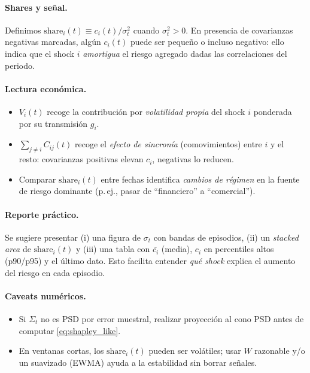 \documentclass[11pt,a4paper]{article}
\newcommand{\1}{\mathbf{1}}
\begin{document}
\paragraph{Shares y señal.}
Definimos \(\text{share}_i(t) \equiv c_i(t)/\sigma_t^2\) cuando \(\sigma_t^2>0\). En presencia de covarianzas negativas marcadas, algún \(c_i(t)\) puede ser pequeño o incluso negativo: ello indica que el shock \(i\) \emph{amortigua} el riesgo agregado dadas las correlaciones del periodo.

\paragraph{Lectura económica.}
\begin{itemize}
  \item \(V_i(t)\) recoge la contribución por \emph{volatilidad propia} del shock \(i\) ponderada por su transmisión \(g_i\).
  \item \(\sum_{j\ne i} C_{ij}(t)\) recoge el \emph{efecto de sincronía} (comovimientos) entre \(i\) y el resto: covarianzas positivas elevan \(c_i\), negativas lo reducen.
  \item Comparar \(\text{share}_i(t)\) entre fechas identifica \emph{cambios de régimen} en la fuente de riesgo dominante (p.\,ej., pasar de ``financiero'' a ``comercial'').
\end{itemize}

\paragraph{Reporte práctico.}
Se sugiere presentar (i) una figura de \(\sigma_t\) con bandas de episodios, (ii) un \emph{stacked area} de \(\text{share}_i(t)\) y (iii) una tabla con \(\overline{c_i}\) (media), \(c_i\) en percentiles altos (p90/p95) y el último dato. Esto facilita entender \emph{qué shock} explica el aumento del riesgo en cada episodio.

\paragraph{Caveats numéricos.}
\begin{itemize}
  \item Si \(\Sigma_t\) no es PSD por error muestral, realizar proyección al cono PSD antes de computar \eqref{eq:shapley_like}.
  \item En ventanas cortas, los \(\text{share}_i(t)\) pueden ser volátiles; usar \(W\) razonable y/o un suavizado (EWMA) ayuda a la estabilidad sin borrar señales.
\end{itemize}
\end{document}
